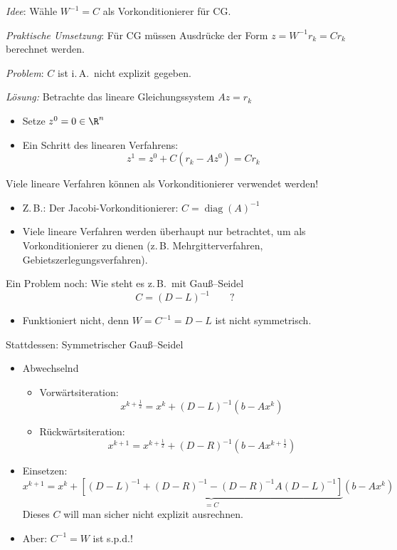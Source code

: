 \bigskip

\emph{Idee}: Wähle $W^{-1}=C$ als Vorkonditionierer für CG.

\medskip

\emph{Praktische Umsetzung}: Für CG müssen Ausdrücke der Form $z = W^{-1} r_k = Cr_k$ berechnet werden.

\medskip

\emph{Problem}: $C$ ist i.\,A.\ nicht explizit gegeben.

\smallskip

\emph{Lösung:} Betrachte das lineare Gleichungssystem $Az=r_k$
\begin{itemize}
 \item Setze $z^0=0 \in \R^n$
 \item Ein Schritt des linearen Verfahrens:
  \begin{equation*}
   z^1=z^0+C (r_k-Az^0)=Cr_k
  \end{equation*}
\end{itemize}

\bigskip

Viele lineare Verfahren können als Vorkonditionierer verwendet werden!

\begin{itemize}
 \item Z.\,B.: Der Jacobi-Vorkonditionierer: $C=\operatorname{diag} (A)^{-1}$
 \item Viele lineare Verfahren werden überhaupt nur betrachtet, um als Vorkonditionierer zu dienen
       (z.\,B. Mehrgitterverfahren, Gebietszerlegungsverfahren).
\end{itemize}
Ein Problem noch: Wie steht es z.\,B.\ mit Gauß--Seidel
\begin{equation*}
 C = (D-L)^{-1}
 \qquad ?
\end{equation*}
\begin{itemize}
	\item Funktioniert nicht, denn $W=C^{-1}=D-L$ ist nicht symmetrisch.
\end{itemize}
\medskip
Stattdessen: Symmetrischer Gauß--Seidel
\begin{itemize}
 \item Abwechselnd
  \begin{itemize}
   \item Vorwärtsiteration:
    \begin{equation*}
     x^{k+\frac{1}{2}}=x^k+(D-L)^{-1} (b-Ax^k)
    \end{equation*}
   \item Rückwärtsiteration:
    \begin{equation*}
     x^{k+1}=x^{k+\frac{1}{2}}+(D-R)^{-1} (b-Ax^{k+\frac{1}{2}})
    \end{equation*}
   \end{itemize}
 \item Einsetzen:
  \begin{equation*}
   x^{k+1}=x^k+\underbrace{\left[(D-L)^{-1}+(D-R)^{-1}-(D-R)^{-1}A(D-L)^{-1} \right]}_{=C} (b-Ax^k)
  \end{equation*}
  Dieses $C$ will man sicher nicht explizit ausrechnen.
 \item Aber: $C^{-1}=W$ ist s.p.d.!
\end{itemize}

